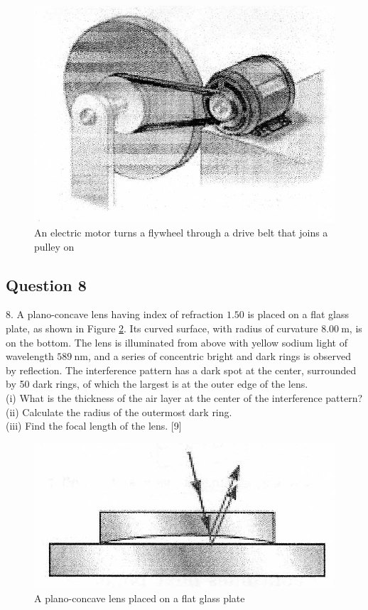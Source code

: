 \documentclass{article}
\begin{document}
\begin{figure}
	\centering
	\includegraphics[width=0.5\linewidth]{spho_book_TYS_images/2010q7.png}
	\caption{An electric motor turns a flywheel through a drive belt that joins a pulley on}\label{2010q7}
\end{figure}

\subsection{Question 8}
8. A plano-concave lens having index of refraction $1.50$ is placed on a flat glass plate, as shown in Figure \ref{2010q8}. Its curved surface, with radius of curvature $8.00 \mathrm{~m}$, is on the bottom. The lens is illuminated from above with yellow sodium light of wavelength $589 \mathrm{~nm}$, and a series of concentric bright and dark rings is observed by reflection. The interference pattern has a dark spot at the center, surrounded by 50 dark rings, of which the largest is at the outer edge of the lens. \\
(i) What is the thickness of the air layer at the center of the interference pattern? \\
(ii) Calculate the radius of the outermost dark ring. \\
(iii) Find the focal length of the lens. [9]

\begin{figure}
	\centering
	\includegraphics[width=0.5\linewidth]{spho_book_TYS_images/2010q8.png}
	\caption{A plano-concave lens placed on a flat glass plate} \label{2010q8}
\end{figure}
\end{document}
